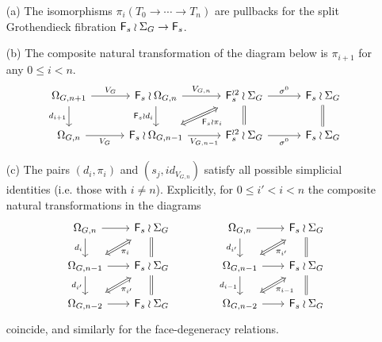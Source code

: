 \documentclass[a4paper,10pt]{article}%
\begin{document}
\begin{proposition}\label{PIIPROP PROP}
\begin{itemize}
\item[(a)] The isomorphisms $\pi_i(T_0 \to \cdots \to T_n)$
are pullbacks for the split Grothendieck fibration $\mathsf{F}_s \wr \Sigma_G \to \mathsf{F}_s$.

\item[(b)] The composite natural transformation of the diagram below is $\pi_{i+1}$ for any $0 \leq i <n$.
\begin{equation}
\begin{tikzcd}[row sep=1.7em,column sep = 3em]
	\Omega_{G,n+1} \ar{d}[swap]{d_{i+1}} \ar{r}{V_G} &
	\Fin_s \wr \Omega_{G,n} \ar{r}{V_{G,n}} 
	\ar{d}[swap]{\Fin_s \wr d_{i}} &
	|[alias=F1]|
	\Fin_s^{\wr 2} \wr \Sigma_G \ar[equal]{d} \ar{r}{\sigma^0} &
	\Fin_s \wr \Sigma_G \ar[equal]{d}
\\
	\Omega_{G,n} \ar{r}[swap]{V_G}&
	|[alias=G2]|
	\Fin_s \wr \Omega_{G,n-1} \ar{r}[swap]{V_{G,n-1}} &
	\Fin_s^{\wr 2} \wr \Sigma_G \ar{r}[swap]{\sigma^0} &
	\Fin_s \wr \Sigma_G
\arrow[Leftrightarrow, from=F1, to=G2,shorten >=0.15cm,shorten <=0.15cm,"\Fin_s \wr \pi_{i}"]
\end{tikzcd}
\end{equation}

\item[(c)] The pairs $(d_i,\pi_i)$ and
$(s_j,id_{V_{G,n}})$ satisfy all possible simplicial identities (i.e. those with $i \neq n$).
Explicitly, for $0 \leq i' < i < n$
the composite natural transformations
in the diagrams
\begin{equation}
\begin{tikzcd}[row sep=1.7em,column sep = 2em]
	\Omega_{G,n} \ar{r}{} \ar{d}[swap]{d_{i}} &
	|[alias=F1]|
	\Fin_s \wr \Sigma_G \ar[equal]{d}
&&
	\Omega_{G,n} \ar{r}{} \ar{d}[swap]{d_{i'}} &
	|[alias=F12]|
	\Fin_s \wr \Sigma_G \ar[equal]{d}
\\
	|[alias=G2]|
	\Omega_{G,n-1} \ar{r}[swap]{}  \ar{d}[swap]{d_{i'}} &
	|[alias=F2]|
	\Fin_s \wr \Sigma_G \ar[equal]{d}
&&
	|[alias=G22]|
	\Omega_{G,n-1} \ar{r}[swap]{}  \ar{d}[swap]{d_{i-1}} &
	|[alias=F22]|
	\Fin_s \wr \Sigma_G \ar[equal]{d}
\\
	|[alias=G3]|
	\Omega_{G,n-2} \ar{r}{} &
	\Fin_s \wr \Sigma_G
&&
	|[alias=G32]|
	\Omega_{G,n-2} \ar{r}{} &
	\Fin_s \wr \Sigma_G
\arrow[Leftrightarrow, from=F1, to=G2,shorten >=0.15cm,shorten <=0.15cm,"\pi_{i}"]
\arrow[Leftrightarrow, from=F2, to=G3,shorten >=0.15cm,shorten <=0.15cm,"\pi_{i'}"]
\arrow[Leftrightarrow, from=F12, to=G22,shorten >=0.15cm,shorten <=0.15cm,"\pi_{i'}"]
\arrow[Leftrightarrow, from=F22, to=G32,shorten >=0.15cm,shorten <=0.15cm,"\pi_{i-1}"]
\end{tikzcd}
\end{equation}
coincide, and similarly for the face-degeneracy relations.
\end{itemize}
\end{proposition}
\end{document}
